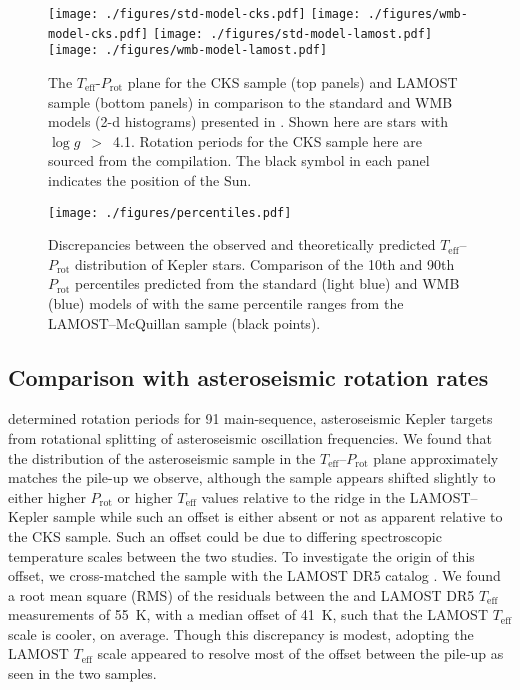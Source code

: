 \documentclass[linenumbers,tighten,trackchanges,twocolumn]{aastex631}
\newcommand{\teff}{\ensuremath{T_{\mathrm{eff}}}\xspace}
\newcommand{\logg}{\ensuremath{\log g}\xspace}
\newcommand{\prot}{\ensuremath{P_\mathrm{rot}}\xspace}
\begin{document}
\begin{figure*}
    \centering 
    \texttt{[image: ./figures/std-model-cks.pdf]}
    \texttt{[image: ./figures/wmb-model-cks.pdf]}
    \texttt{[image: ./figures/std-model-lamost.pdf]}
    \texttt{[image: ./figures/wmb-model-lamost.pdf]}
    \caption{The \teff-\prot plane for the CKS sample (top panels) and LAMOST sample (bottom panels) in comparison to the standard and WMB models (2-d histograms) presented in \citet{vanSaders2019}. Shown here are stars with \logg~$>$~4.1. Rotation periods for the CKS sample here are sourced from the \citet{David2021} compilation. The black symbol in each panel indicates the position of the Sun.}
    \label{fig:models}
\end{figure*}

\begin{figure}
    \centering
    \texttt{[image: ./figures/percentiles.pdf]}
    \caption{Discrepancies between the observed and theoretically predicted \teff--\prot distribution of Kepler stars. Comparison of the 10th and 90th \prot percentiles predicted from the standard (light blue) and WMB (blue) models of \citet{vanSaders2019} with the same percentile ranges from the LAMOST--McQuillan sample (black points).}
    \label{fig:percentiles}
\end{figure}

\subsection{Comparison with asteroseismic rotation rates}
\label{subsec:asteroseismic}

\citet{Hall2021} determined rotation periods for 91 main-sequence, asteroseismic Kepler targets from rotational splitting of asteroseismic oscillation frequencies. We found that the distribution of the asteroseismic sample in the \teff--\prot plane approximately matches the pile-up we observe, although the \citet{Hall2021} sample appears shifted slightly to either higher \prot or higher \teff values relative to the ridge in the LAMOST--Kepler sample while such an offset is either absent or not as apparent relative to the CKS sample. Such an offset could be due to differing spectroscopic temperature scales between the two studies. To investigate the origin of this offset, we cross-matched the \citet{Hall2021} sample with the LAMOST DR5 catalog \citep{Xiang2019}. We found a root mean square (RMS) of the residuals between the \citet{Hall2021} and LAMOST DR5 \teff measurements of 55~K, with a median offset of 41~K, such that the LAMOST \teff scale is cooler, on average. Though this discrepancy is modest, adopting the LAMOST \teff scale appeared to resolve most of the offset between the pile-up as seen in the two samples. 
\end{document}
